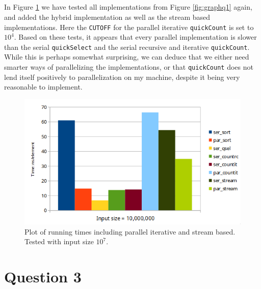 \documentclass[a5paper]{article}
\begin{document}
\subsection{} 
In Figure \ref{fig:graphq2} we have tested all implementations from Figure \ref{fig:graphq1} again, and added the hybrid implementation as well as the stream based implementations. Here the \texttt{CUTOFF} for the parallel iterative \texttt{quickCount} is set to $10^4$. Based on these tests, it appears that every parallel implementation is slower than the serial \texttt{quickSelect} and the serial recursive and iterative \texttt{quickCount}. While this is perhaps somewhat surprising, we can deduce that we either need smarter ways of parallelizing the implementations, or that \texttt{quickCount} does not lend itself positively to parallelization on my machine, despite it being very reasonable to implement.
\begin{figure}[ht!]
    \centering
    \noindent\includegraphics[scale=0.45]{res/graph_q2.png}
    \caption{Plot of running times including parallel iterative and stream based. Tested with input size $10^7$.}
    \label{fig:graphq2}
\end{figure}

\section{Question 3}
\end{document}
